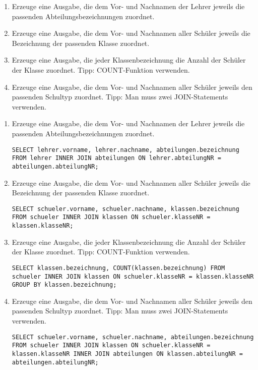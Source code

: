 \begin{Exercise}[title={Bearbeite folgende Aufgaben}, label=Join]
	\begin{enumerate}
		\item Erzeuge eine Ausgabe, die dem Vor- und Nachnamen der Lehrer jeweils die passenden Abteilungsbezeichnungen zuordnet.
		\item Erzeuge eine Ausgabe, die dem Vor- und Nachnamen aller Schüler jeweils die Bezeichnung der passenden Klasse zuordnet.
		\item Erzeuge eine Ausgabe, die jeder Klassenbezeichnung die Anzahl der Schüler der Klasse zuordnet. Tipp: COUNT-Funktion verwenden.
		\item Erzeuge eine Ausgabe, die dem Vor- und Nachnamen aller Schüler jeweils den passenden Schultyp zuordnet. Tipp: Man muss zwei JOIN-Statements verwenden.
	\end{enumerate}
\end{Exercise}
\begin{Answer}[ref=Join]
	\begin{enumerate}
		\item Erzeuge eine Ausgabe, die dem Vor- und Nachnamen der Lehrer jeweils die passenden Abteilungsbezeichnungen zuordnet.

		\lstinline[breaklines=true]!SELECT lehrer.vorname, lehrer.nachname, abteilungen.bezeichnung FROM lehrer INNER JOIN abteilungen ON lehrer.abteilungNR = abteilungen.abteilungNR;!
		\item Erzeuge eine Ausgabe, die dem Vor- und Nachnamen aller Schüler jeweils die Bezeichnung der passenden Klasse zuordnet.

		\lstinline[breaklines=true]!SELECT schueler.vorname, schueler.nachname, klassen.bezeichnung FROM schueler INNER JOIN klassen ON schueler.klasseNR = klassen.klasseNR;!
		\item Erzeuge eine Ausgabe, die jeder Klassenbezeichnung die Anzahl der Schüler der Klasse zuordnet. Tipp: COUNT-Funktion verwenden.

		\lstinline[breaklines=true]!SELECT klassen.bezeichnung, COUNT(klassen.bezeichnung) FROM schueler INNER JOIN klassen ON schueler.klasseNR = klassen.klasseNR GROUP BY klassen.bezeichnung;!
		\item Erzeuge eine Ausgabe, die dem Vor- und Nachnamen aller Schüler jeweils den passenden Schultyp zuordnet. Tipp: Man muss zwei JOIN-Statements verwenden.

		\lstinline[breaklines=true]!SELECT schueler.vorname, schueler.nachname, abteilungen.bezeichnung FROM schueler INNER JOIN klassen ON schueler.klasseNR = klassen.klasseNR INNER JOIN abteilungen ON klassen.abteilungNR = abteilungen.abteilungNR;!
	\end{enumerate}
\end{Answer}